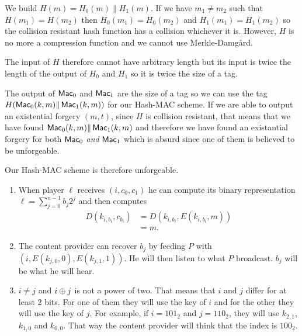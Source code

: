 \begin{solution}
  We build $H(m) = H_0(m)\|H_1(m)$.
  If we have $m_1 \neq m_2$ such that $H(m_1) = H(m_2)$ then $H_0(m_1) = H_0(m_2)$ and
  $H_1(m_1) = H_1(m_2)$ so the collision resistant hash function has a collision whichever it is.
  However, $H$ is no more a compression function and we cannot use Merkle-Damg\aa{}rd.

  The input of $H$ therefore cannot have arbitrary length but its input is twice the length of the output of $H_0$ and $H_1$
  so it is twice the size of a tag.

  The output of $\operatorname{\mathsf{Mac}}_0$ and $\operatorname{\mathsf{Mac}}_1$ are the size of a tag so we can use the tag
  $H(\operatorname{\mathsf{Mac}}_0(k,m)\|\operatorname{\mathsf{Mac}}_1(k,m))$ for our Hash-MAC scheme.
  If we are able to output an existential forgery $(m, t)$,
  since $H$ is collision resistant, that means that we have found
  $\operatorname{\mathsf{Mac}}_0(k,m)\|\operatorname{\mathsf{Mac}}_1(k,m)$ and therefore we have found an existantial forgery for both
  $\operatorname{\mathsf{Mac}}_0$ \emph{and} $\operatorname{\mathsf{Mac}}_1$ which is absurd since one of them is believed to be unforgeable.

  Our Hash-MAC scheme is therefore unforgeable.
\end{solution}

\begin{solution}
  \begin{enumerate}
    \item When player $\ell$ receives $(i,c_0,c_1)$ he can compute its binary representation $\ell = \sum_{j=0}^{n-1} b_j2^j$
      and then computes
      \begin{align*}
        D(k_{i,b_i}, c_{b_i})
        & = D(k_{i,b_i}, E(k_{i,b_i}, m))\\
        & = m.
      \end{align*}
    \item The content provider can recover $b_j$ by feeding $P$ with $(i,E(k_{j,0},0),E(k_{j,1},1))$.
      He will then listen to what $P$ broadcast.
      $b_j$ will be what he will hear.
    \item $i \neq j$ and $i \oplus j$ is not a power of two.
      That means that $i$ and $j$ differ for at least 2 bits.
      For one of them they will use the key of $i$ and for the other they will use the key of $j$.
      For example, if $i = 101_2$ and $j = 110_2$, they will use $k_{2,1}$, $k_{1,0}$ and $k_{0,0}$.
      That way the content provider will think that the index is $100_2$.
  \end{enumerate}
\end{solution}

